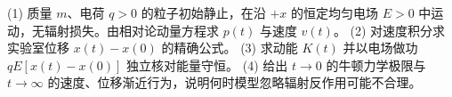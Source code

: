 (1) 质量 \(m\)、电荷 \(q>0\) 的粒子初始静止，在沿 \(+x\) 的恒定均匀电场 \(E>0\) 中运动，无辐射损失。由相对论动量方程求 \(p(t)\) 与速度 \(v(t)\)。
(2) 对速度积分求实验室位移 \(x(t)-x(0)\) 的精确公式。
(3) 求动能 \(K(t)\) 并以电场做功 \(qE[x(t)-x(0)]\) 独立核对能量守恒。
(4) 给出 \(t\to0\) 的牛顿力学极限与 \(t\to\infty\) 的速度、位移渐近行为，说明何时模型忽略辐射反作用可能不合理。
